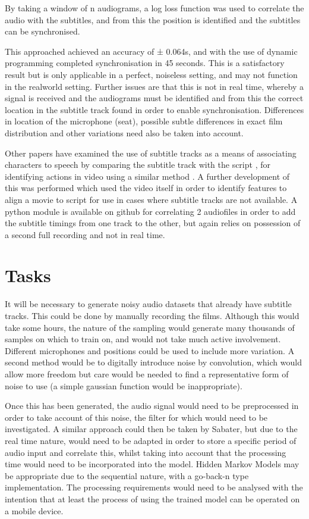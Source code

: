 \documentclass[a4paper]{article}
\begin{document}
By taking a window of n audiograms, a log loss function was used to correlate the audio with the subtitles, and from this the position is identified and the subtitles can be synchronised.

This approached achieved an accuracy of ± 0.064s, and with the use of dynamic programming completed synchronisation in 45 seconds. This is a satisfactory result but is only applicable in a perfect, noiseless setting, and may not function in the realworld setting. Further issues are that this is not in real time, whereby a signal is received and the audiograms must be identified and from this the correct location in the subtitle track found in order to enable synchronisation. Differences in location of the microphone (seat), possible subtle differences in exact film distribution and other variations need also be taken into account.

Other papers have examined the use of subtitle tracks as a means of associating characters to speech by comparing the subtitle track with the script \cite{Everingham2006}, for identifying actions in video using a similar method \cite{Cour2008}. A further development of this was performed \cite{K2009} which used the video itself in order to identify features to align a movie to script for use in cases where subtitle tracks are not available. A python module is available on github for correlating 2 audiofiles in order to add the subtitle timings from one track to the other, but again relies on possession of a second full recording and not in real time.

\section{Tasks}
It will be necessary to generate noisy audio datasets that already have subtitle tracks. This could be done by manually recording the films. Although this would take some hours, the nature of the sampling would generate many thousands of samples on which to train on, and would not take much active involvement. Different microphones and positions could be used to include more variation. A second method would be to digitally introduce noise by convolution, which would allow more freedom but care would be needed to find a representative form of noise to use (a simple gaussian function would be inappropriate).

Once this has been generated, the audio signal would need to be preprocessed in order to take account of this noise, the filter for which would need to be investigated. A similar approach could then be taken by Sabater, but due to the real time nature, would need to be adapted in order to store a specific period of audio input and correlate this, whilst taking into account that the processing time would need to be incorporated into the model. Hidden Markov Models may be appropriate due to the sequential nature, with a go-back-n type implementation. The processing requirements would need to be analysed with the intention that at least the process of using the trained model can be operated on a mobile device.

%

\printbibliography
\end{document}

